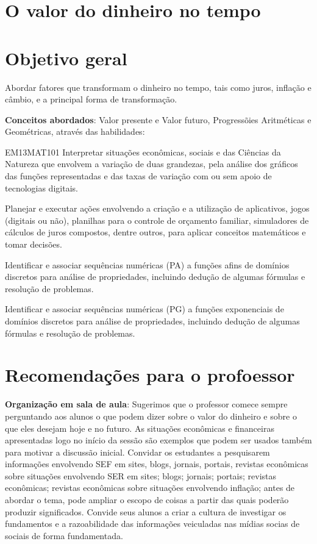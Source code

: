 \begin{paginatexto2}
\section*{O valor do dinheiro no tempo}

\section*{Objetivo geral}

Abordar fatores que transformam o dinheiro no tempo, tais como juros, inflação e câmbio, e a principal forma de transformação.

\textbf{Conceitos abordados}: Valor presente e Valor futuro, Progressõies Aritméticas e Geométricas, através das habilidades:

\begin{objetivos}{EM13MAT101}
 Interpretar situações econômicas, sociais e das Ciências da Natureza
que envolvem a variação de duas grandezas, pela análise dos gráficos das funções representadas e das taxas de variação com ou sem apoio de tecnologias digitais.

Planejar e executar ações envolvendo a criação e a utilização de aplicativos, jogos (digitais ou não), planilhas para o controle de orçamento familiar, simuladores de cálculos de juros compostos, dentre outros, para aplicar conceitos matemáticos e tomar decisões. 

Identificar e associar sequências numéricas (PA) a funções afins de domínios discretos para análise de propriedades, incluindo dedução de algumas fórmulas e resolução de problemas.

Identificar e associar sequências numéricas (PG) a funções exponenciais de domínios discretos para análise de propriedades, incluindo dedução de algumas fórmulas e resolução de problemas.
\end{objetivos}

\section*{Recomendações para o profoessor}
\textbf{Organização em sala de aula}: Sugerimos que o professor comece sempre perguntando aos alunos o que podem dizer sobre o valor do dinheiro e sobre o que eles desejam hoje e no futuro. As situações econômicas e financeiras apresentadas logo no início da sessão são exemplos que podem ser usados também para motivar a discussão inicial. Convidar os estudantes a pesquisarem informações envolvendo SEF em sites, blogs, jornais, portais, revistas econômicas sobre situações envolvendo SER em sites; blogs; jornais; portais; revistas econômicas; revistas econômicas sobre situações envolvendo inflação; antes de abordar o tema, pode ampliar o escopo de coisas a partir das quais poderão produzir significados. Convide seus alunos a criar a cultura de investigar os fundamentos e a razoabilidade das informações veiculadas nas mídias socias de sociais de forma fundamentada.


\end{paginatexto2}
